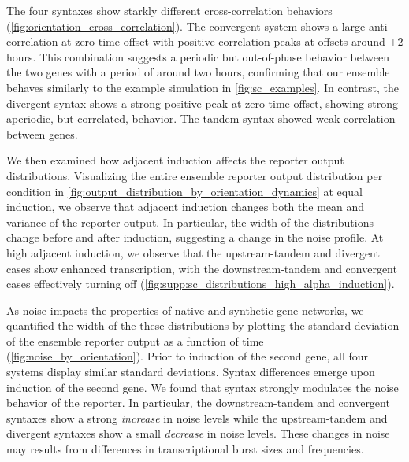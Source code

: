 \documentclass[11pt]{article}
\begin{document}
The four syntaxes show starkly different cross-correlation behaviors (\cref{fig:orientation_cross_correlation}).  The convergent system shows a large anti-correlation at zero time offset with positive correlation peaks at offsets around \(\pm 2\) hours. This combination suggests a periodic but out-of-phase behavior between the two genes with a period of around two hours, confirming that our ensemble behaves similarly to the example simulation in \cref{fig:sc_examples}. In contrast, the divergent syntax shows a strong positive peak at zero time offset, showing strong aperiodic, but correlated, behavior. The tandem syntax showed weak correlation between genes. 

We then examined how adjacent induction affects the reporter output distributions. Visualizing the entire ensemble reporter output distribution per condition in \cref{fig:output_distribution_by_orientation_dynamics} at equal induction, we observe that adjacent induction changes both the mean and variance of the reporter output. In particular, the width of the distributions change before and after induction, suggesting a change in the noise profile. At high adjacent induction, we observe that the upstream-tandem and divergent cases show enhanced transcription, with the downstream-tandem and convergent cases effectively turning off (\cref{fig:supp:sc_distributions_high_alpha_induction}).

As noise impacts the properties of native and synthetic gene networks, we quantified the width of the these distributions by plotting the standard deviation of the ensemble reporter output as a function of time (\cref{fig:noise_by_orientation}). Prior to induction of the second gene, all four systems display similar standard deviations. Syntax differences emerge upon induction of the second gene. We found that syntax strongly modulates the noise behavior of the reporter. In particular, the downstream-tandem and convergent syntaxes show a strong \emph{increase} in noise levels while the upstream-tandem and divergent syntaxes show a small \emph{decrease} in noise levels. These changes in noise may results from differences in transcriptional burst sizes and frequencies.
\end{document}
